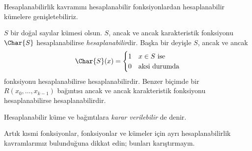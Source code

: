 \documentclass[../../../include/open-logic-section]{subfiles}
\begin{document}

Hesaplanabilirlik kavramını hesaplanabilir fonksiyonlardan hesaplanabilir
kümelere genişletebiliriz.

\begin{defn}
  $S$ bir doğal sayılar kümesi olsun. $S$, ancak ve ancak karakteristik
  fonksiyonu $\Char{S}$ hesaplanabilirse \emph{hesaplanabilir}dir. Başka bir
  deyişle $S$, ancak ve ancak
  \[
    \Char{S}(x)=\begin{cases}
      1 & \text{$x\in S$ ise}\\
      0 & \text{aksi durumda}
    \end{cases}
  \]
  fonksiyonu hesaplanabilirse hesaplanabilirdir. Benzer biçimde bir
  $R(x_0,\dots,x_{k-1})$ bağıntısı ancak ve ancak karakteristik fonksiyonu
  hesaplanabilirse hesaplanabilirdir.

  Hesaplanabilir küme ve bağıntılara \emph{karar verilebilir} de denir.
\end{defn}

\begin{explain}
Artık kısmi fonksiyonlar, fonksiyonlar ve kümeler için ayrı hesaplanabilirlik
kavramlarımız bulunduğuna dikkat edin; bunları karıştırmayın.
\end{explain}
\end{document}
